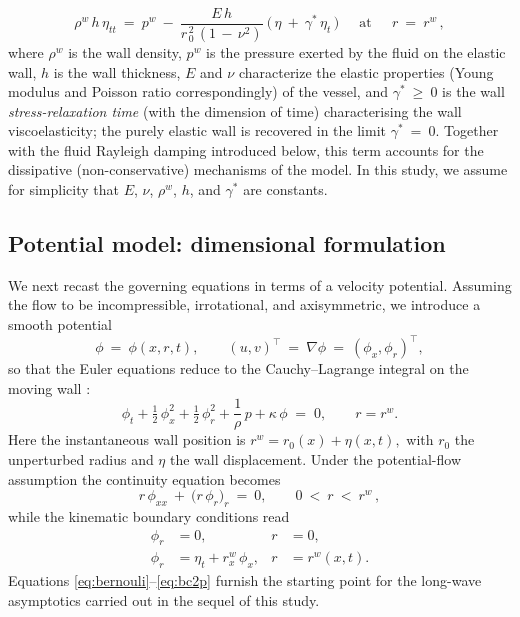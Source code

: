 \documentclass[alpha-refs, 12pt]{wiley-article}
\renewcommand{\geq}{\geqslant}
\begin{document}
\begin{equation*}
    \rho^{w}\,h\,\eta_{tt}\ =\ p^{w}\ -\ \frac{E\,h}{r_{\,0}^{\,2}\,(1\,-\,\nu^2)}\:\bigl(\,\eta\ +\ \gamma^{\ast}\,\eta_{t}\,\bigr)\ \quad\ \mbox{at}\ \quad\ r\ =\ r^{w}\,,
\end{equation*}
where $\rho^{w}$ is the wall density, $p^{w}$ is the pressure exerted by the fluid on the elastic wall, $h$ is the wall thickness, $E$ and $\nu$ characterize the elastic properties (Young modulus and Poisson ratio correspondingly) of the vessel, and $\gamma^{\ast}\ \geq\ 0$ is the wall \emph{stress-relaxation time} (with the dimension of time) characterising the wall viscoelasticity; the purely elastic wall is recovered in the limit $\gamma^{\ast}\ =\ 0$. Together with the fluid Rayleigh damping introduced below, this term accounts for the dissipative (non-conservative) mechanisms of the model. In this study, we assume for simplicity that $E$, $\nu$, $\rho^{w}$, $h$, and $\gamma^{\ast}$ are constants.

\subsection{Potential model: dimensional formulation}

We next recast the governing equations in terms of a velocity potential. Assuming the flow to be incompressible, irrotational, and axisymmetric, we introduce a smooth potential
\[
  \phi\ =\ \phi(x,r,t),\qquad
  (u,v)^{\top}\ =\ \nabla\phi\ =\ (\phi_{x},\phi_{r})^{\top},
\]
so that the Euler equations reduce to the Cauchy--Lagrange integral on the moving wall \citep{Mitsotakis2019}:
\begin{equation}\label{eq:bernouli}
  \phi_{t}
  +\tfrac{1}{2}\,\phi_{x}^{2}
  +\tfrac{1}{2}\,\phi_{r}^{2}
  +\frac{1}{\rho}\,p
  +\kappa\,\phi
  \;=\;0,
  \qquad
  r=r^{w}.
\end{equation}
Here the instantaneous wall position is
\(
  r^{w}=r_{0}(x)+\eta(x,t),
\)
with $r_{0}$ the unperturbed radius and $\eta$ the wall displacement. Under the potential-flow assumption the continuity equation becomes
\begin{equation}\label{eq:massp}
  r\,\phi_{xx}\ +\ \bigl(r\,\phi_{r}\bigr)_{r}\ =\ 0, \qquad 0\ <\ r\ <\ r^{w}\,,
\end{equation}
while the kinematic boundary conditions read
\begin{align}
  \phi_{r}&=0,
  & r&=0, \label{eq:bc1p}\\[2pt]
  \phi_{r}&=\eta_{t}+r^{w}_{x}\,\phi_{x},
  & r&=r^{w}(x,t).\label{eq:bc2p}
\end{align}
Equations \eqref{eq:bernouli}--\eqref{eq:bc2p} furnish the starting point for the long-wave asymptotics carried out in the sequel of this study.
\end{document}
